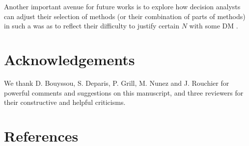 \documentclass[preprint, french, english, 11pt, authoryear]{elsarticle}%
\begin{document}
Another important avenue for future works is to explore how decision analysts can adjust their selection of methods (or their combination of parts of methods) in such a was as to reflect their difficulty to justify certain $N$ with some DM%
 \citep{mingers_towards_1997}.


\setcounter{secnumdepth}{0}
\section{Acknowledgements}
We thank D. Bouyssou, S. Deparis, P. Grill, M. Nunez and J. Rouchier for powerful comments and suggestions on this manuscript, and three reviewers for their constructive and helpful criticisms.

\section{References}

\end{document}
